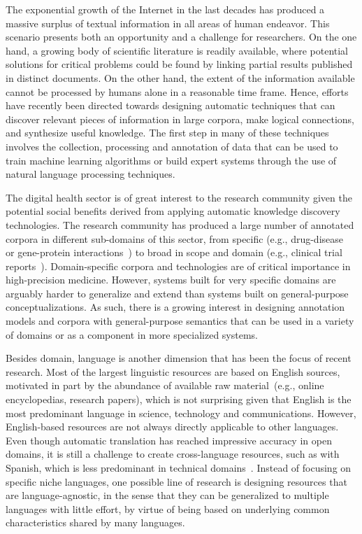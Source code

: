 The exponential growth of the Internet in the last decades has produced a massive surplus of textual information in all areas of human endeavor. This scenario presents both an opportunity and a challenge for researchers. On the one hand, a growing body of scientific literature is readily available, where potential solutions for critical problems could be found by linking partial results published in distinct documents. On the other hand, the extent of the information available cannot be processed by humans alone in a reasonable time frame. Hence,  efforts have recently been directed towards designing automatic techniques that can discover relevant pieces of information in large corpora, make logical connections, and synthesize useful knowledge.
The first step in many of these techniques involves the collection, processing and annotation of data that can be used to train machine learning algorithms or build expert systems through the use of natural language processing techniques.

The digital health sector is of great interest to the research community given the potential social benefits derived from applying automatic knowledge discovery technologies. The research community has produced a large number of annotated corpora in different sub-domains of this sector, from specific (e.g., drug-disease~\cite{goldberg1996drug} or gene-protein interactions~\cite{tanabe2005genetag}) to broad in scope and domain (e.g., clinical trial reports~\cite{nye2018corpus}).
Domain-specific corpora and technologies are of critical importance in high-precision medicine.
However, systems built for very specific domains are arguably harder to generalize and extend than systems built on general-purpose conceptualizations.
As such, there is a growing interest in designing annotation models and corpora with general-purpose semantics that can be used in a variety of domains or as a component in more specialized systems.

Besides domain, language is another dimension that has been the focus of recent research.
Most of the largest linguistic resources are based on English sources, motivated in part by the abundance of available raw material~(e.g., online encyclopedias, research papers), which is not surprising given that English is the most predominant language in science, technology and communications.
However, English-based resources are not always directly applicable to other languages.
Even though automatic translation has reached impressive accuracy in open domains, it is still a challenge to create cross-language resources, such as with Spanish, which is less predominant in technical domains~\cite{villegas2018mespen}.
Instead of focusing on specific niche languages, one possible line of research is designing resources that are
language-agnostic, in the sense that they can be generalized to multiple languages with little effort, by virtue
of being based on underlying common characteristics shared by many languages.

